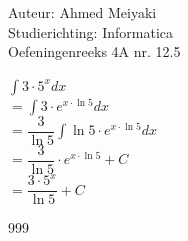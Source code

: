 \documentclass[a4paper]{article}
\begin{document}
  
\noindent \large Auteur: Ahmed Meiyaki \\
\noindent \large Studierichting: Informatica\\
\noindent \large Oefeningenreeks 4A nr. 12.5\\

\medskip

\normalsize

$\displaystyle\int 3 \cdot 5^x dx $\\

$= \displaystyle\int 3 \cdot e^{x \cdot \ln5} dx $\\

$= \dfrac{3}{\ln5} \displaystyle\int \ln5 \cdot e^{x \cdot \ln5} dx $\\

$= \dfrac{3}{\ln5} \cdot e^{x \cdot \ln5} + C  $\\

$= \dfrac{3 \cdot 5^x}{\ln5} + C $\\








\begin{thebibliography}{999}
\end{thebibliography}
\end{document}
